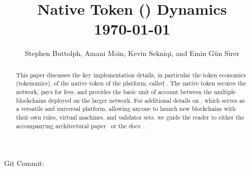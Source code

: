 \documentclass[runningheads]{llncs}
\begin{document}
\immediate{}

\title{\AVAPlatformName{} Native Token (\AVATokenName{}) Dynamics \\\today}
\author{Stephen Buttolph, Amani Moin, Kevin Sekniqi, and Emin G{\"u}n Sirer}
\institute{}

\maketitle

\begin{abstract}

This paper discusses the key implementation details, in particular the token economics (tokenomics), of the native token of the \AVAPlatformName{} platform, called \AVATokenName{}. The native token secures the network, pays for fees, and provides the basic unit of account between the multiple blockchains deployed on the larger \AVAPlatformName{} network. 
For additional details on \AVAPlatformName{}, which serves as a versatile and universal platform, allowing anyone to launch new blockchains with their own rules, virtual machines, and validator sets, we guide the reader to either the accompanying architectural paper~\cite{avaplatformpaper} or the \AVAPlatformName{} docs~\cite{avadocs}.

\end{abstract}
\begin{center} 
   \scriptsize Git Commit: 
\end{center}
\end{document}

